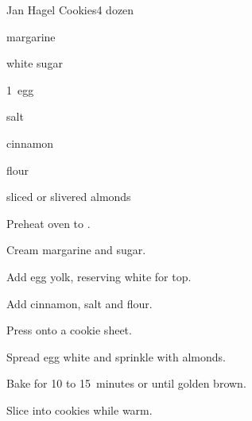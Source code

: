 \begin{recipe}{Jan Hagel Cookies}{}{4 dozen}

\begin{ingredients}
\item {} margarine
\item {} white sugar
\item 1~egg
\item \tp{\half} salt
\item \tp{\half} cinnamon
\item {} flour
\item sliced or slivered almonds
\end{ingredients}

\begin{directions}
\item Preheat oven to .
\item Cream margarine and sugar.
\item Add egg yolk, reserving white for top.
\item Add cinnamon, salt and flour.
\item Press onto a cookie sheet.
\item Spread egg white and sprinkle with almonds.
\item Bake for 10 to 15~minutes or until golden brown.
\item Slice into cookies while warm.
\end{directions}
\end{recipe}

